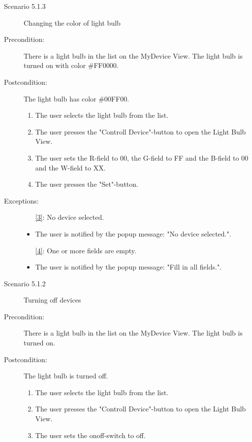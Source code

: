 \documentclass[a4paper]{article}
\begin{document}
\begin{description}
\item[]

\item[Scenario 5.1.3] Changing the color of light bulb
\item[Precondition:] There is a light bulb in the list on the MyDevice View. The light bulb is turned on with color \#FF0000.
\item[Postcondition:] The light bulb has color \#00FF00.
\begin{enumerate}
\item The user selects the light bulb from the list.
\item \label{3} The user presses the "Controll Device"-button to open the Light Bulb View.
\item  \label{4} The user sets the R-field to 00, the G-field to FF and the B-field to 00 and the W-field to XX.
\item The user presses the "Set"-button.

\end{enumerate}

\item[Exceptions:]
\item[]

\begin{itemize}
\item [\ref{3}:] No device selected.
\item The user is notified by the popup message: "No device selected.".
\item [\ref{4}:] One or more fields are empty.
\item The user is notified by the popup message: "Fill in all fields.".

\end{itemize}

\item[]

\item[Scenario 5.1.2] Turning off devices
\item[Precondition:] There is a light bulb in the list on the MyDevice View. The light bulb is turned on.
\item[Postcondition:] The light bulb is turned off.
\begin{enumerate}
\item The user selects the light bulb from the list.
\item \label{5} The user presses the "Controll Device"-button to open the Light Bulb View.
\item  The user sets the onoff-switch to off.
\end{enumerate}


\end{description}
\end{document}
